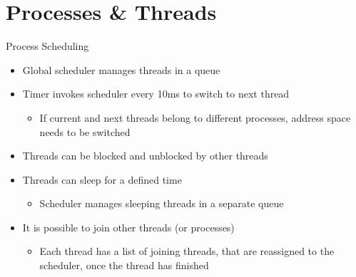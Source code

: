 \section{Processes \& Threads}

\begin{frame}{Process Scheduling}
	\begin{itemize}
		\setlength\itemsep{1em}
		\item Global scheduler manages threads in a queue
		\item Timer invokes scheduler every 10ms to switch to next thread
		\begin{itemize}
			\item If current and next threads belong to different processes, address space needs to be switched
		\end{itemize}
		\item Threads can be blocked and unblocked by other threads
		\item Threads can sleep for a defined time
		\begin{itemize}
			\item Scheduler manages sleeping threads in a separate queue
		\end{itemize}
		\item It is possible to join other threads (or processes)
		\begin{itemize}
			\item Each thread has a list of joining threads, that are reassigned to the scheduler, once the thread has finished
		\end{itemize}
	\end{itemize}	
\end{frame}
